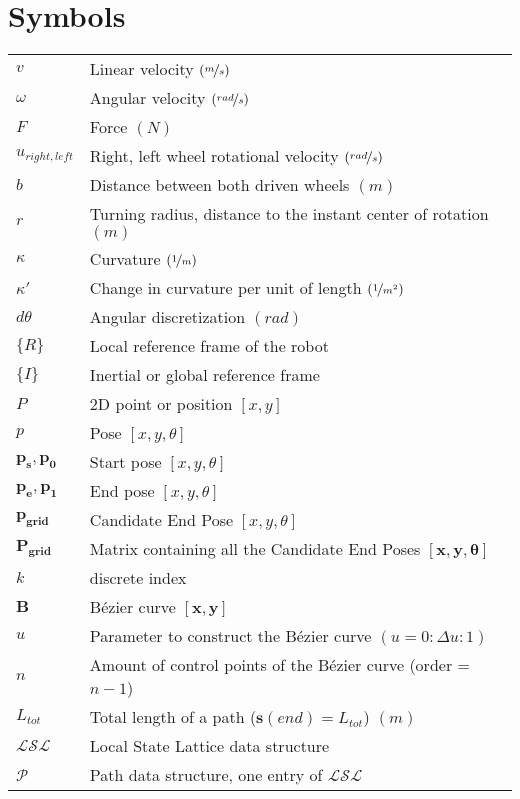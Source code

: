 \documentclass[twoside,english,master=wtk,inputenc="utf8"]{kulemt}
\newcommand{\nf}{\nicefrac}
\begin{document}
\section*{Symbols}
\begin{flushleft}
\renewcommand{\arraystretch}{1.1}
\begin{tabularx}{\textwidth}{@{}p{16mm}X@{}}
$v$					& Linear velocity $(\nf{m}{s})$ \\
$\omega$   	& Angular velocity $(\nf{rad}{s})$  \\
$F$					& Force $(N)$ \\
$u_{right,left}$ & Right, left wheel rotational velocity $(\nf{rad}{s})$ \\
$b$ 					& Distance between both driven wheels $(m)$ \\
$r$   				& Turning radius, distance to the instant center of rotation $(m)$\\
$\kappa$  		& Curvature $(\nf{1}{m})$ \\
$\kappa'$		& Change in curvature per unit of length $(\nf{1}{m^2})$ \\
$d\theta$		& Angular discretization $(rad)$ \\
$\{R\}$ 			& Local reference frame of the robot \\
$\{I\}$ 				& Inertial or global reference frame \\
$P$ 				& 2D point or position $[x, y]$ \\
${p}$				& Pose $[x,y,\theta]$ \\
$\bm{p_s},\bm{p_0}$ 	& Start pose $[x,y,\theta]$ \\
$\bm{p_e},\bm{p_1}$  	& End pose $[x,y,\theta]$ \\
$\bm{p_{grid}}$ & Candidate End Pose  $[x,y,\theta]$\\
$\bm{P_{grid}}$ & Matrix containing all the Candidate End Poses $[\bm{x},\bm{y},\bm{\theta}]$ \\
$k$					& discrete index \\
$\bm{B}$ 		& Bézier curve $[\bm{x}, \bm{y}]$\\
$u$					& Parameter to construct the Bézier curve $(u =0:\Delta u:1)$ \\
$n$					& Amount of control points of the Bézier curve (order = $n-1$) \\
$L_{tot}$		& Total length of a path ($\bm{s}(end)=L_{tot}$) $(m)$\\
$\mathcal{LSL}$ 	& Local State Lattice data structure\\
$\mathcal{P}$ 		& Path data structure, one entry of $\mathcal{LSL}$  \\

\end{tabularx}
\end{flushleft}
\end{document}

